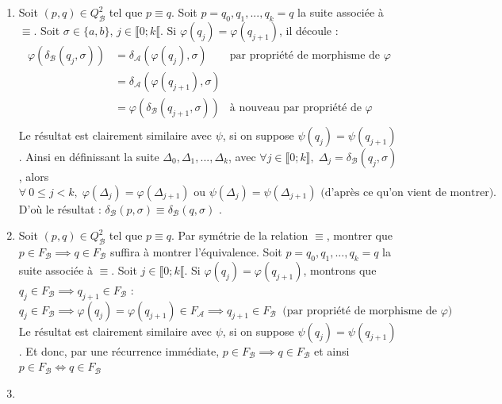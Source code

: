 \documentclass{article}
\begin{document}
\begin{enumerate}
        \item Soit $(p, q) \in Q_\mathcal{B}^2$ tel que $p \equiv q$. Soit $p = q_0, q_1, ..., q_k = q$ la suite associée à $\equiv$. \newline 
        Soit $\sigma \in \{a , b \}$, $j \in \llbracket 0;k \llbracket$. Si $\varphi(q_j) = \varphi(q_{j + 1})$, il découle :
        \begin{align*}
            \varphi(\delta_\mathcal{B}(q_j, \sigma)) &= \delta_\mathcal{A}(\varphi(q_j), \sigma) & \text{par propriété de morphisme de $\varphi$} \\
                                                    &= \delta_\mathcal{A}(\varphi(q_{j + 1}), \sigma) \\
                                                    &= \varphi(\delta_\mathcal{B}(q_{j + 1}, \sigma)) & \text{à nouveau par propriété de $\varphi$} \\
        \end{align*}
        Le résultat est clairement similaire avec $\psi$, si on suppose $\psi(q_j) = \psi(q_{j + 1})$. \newline
        Ainsi en définissant la suite $\Delta_0,\Delta_1, ..., \Delta_k$, avec $\forall j \in \llbracket 0 ; k \rrbracket, \; \Delta_j = \delta_\mathcal{B}(q_j, \sigma)$, alors
        \begin{equation*}
            \forall \: 0 \leq j < k, \; \varphi(\Delta_j) = \varphi(\Delta_{j + 1}) \text{ ou } \psi(\Delta_j) = \psi(\Delta_{j + 1}) \text{ (d'après ce qu'on vient de montrer).}
        \end{equation*}
        D'où le résultat : $\boxed{\delta_\mathcal{B}(p, \sigma) \equiv \delta_\mathcal{B}(q, \sigma)}$ .
        \item Soit $(p, q) \in Q_\mathcal{B}^2$ tel que $p \equiv q$. Par symétrie de la relation $\equiv$, montrer que $ p \in F_\mathcal{B} \implies q \in F_\mathcal{B}$ suffira à montrer l'équivalence. \newline 
        Soit $p = q_0, q_1, ..., q_k = q$ la suite associée à $\equiv$. \newline
        Soit $j \in \llbracket 0;k \llbracket$. Si $\varphi(q_j) = \varphi(q_{j + 1})$, montrons que $q_j \in F_\mathcal{B} \implies q_{j + 1} \in F_\mathcal{B}$ : 
        \begin{equation*}
            q_j \in F_\mathcal{B} \implies \varphi(q_j) = \varphi(q_{j + 1}) \in F_\mathcal{A} \implies q_{j + 1} \in F_\mathcal{B} \;\; \text{(par propriété de morphisme de $\varphi$)}
        \end{equation*}
        Le résultat est clairement similaire avec $\psi$, si on suppose $\psi(q_j) = \psi(q_{j + 1})$. \newline
        Et donc, par une récurrence immédiate, $p \in F_\mathcal{B} \implies q \in F_\mathcal{B}$ et ainsi $\boxed{p \in F_\mathcal{B} \Longleftrightarrow q \in F_\mathcal{B}}$

        \item 
\end{enumerate}
\end{document}
